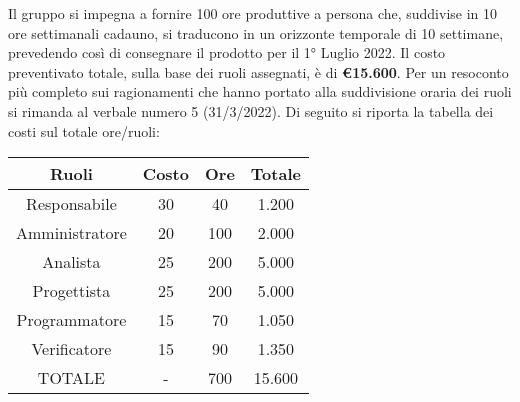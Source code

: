 Il gruppo \textit{\teamname} si impegna a fornire 100 ore produttive a persona che, suddivise in 10 ore settimanali cadauno, si traducono in un orizzonte temporale di 10 settimane, prevedendo così di consegnare il prodotto per il 1° Luglio 2022. \newline
Il costo preventivato totale, sulla base dei ruoli assegnati, è di \textbf{\euro{15.600}}. \newline
Per un resoconto più completo sui ragionamenti che hanno portato alla suddivisione oraria dei ruoli si rimanda al verbale numero 5 (31/3/2022). \newline
Di seguito si riporta la tabella dei costi sul totale ore/ruoli:
\begin{table}
	\begin{center}
		\setlength{\extrarowheight}{.75ex}
		\begin{tabular}{ | c | c | c | c | }
			\hline 	
			\textbf{Ruoli} & \textbf{Costo} & \textbf{Ore} & \textbf{Totale}\\
			\hline 			
			
			Responsabile{} & 30{} & 40{} & 1.200{} \\
			Amministratore{} & 20{} & 100{} & 2.000{} \\
			Analista{} & 25{} & 200{} & 5.000{} \\
			Progettista{} & 25{} & 200{} & 5.000{}  \\
			Programmatore{} & 15{} & 70{} & 1.050{}  \\
			Verificatore{} & 15{} & 90{} & 1.350{}  \\
			TOTALE{} & -{} & 700{} & 15.600{}  \\	
			
			\hline 
		\end{tabular}
	\end{center}
\end{table}